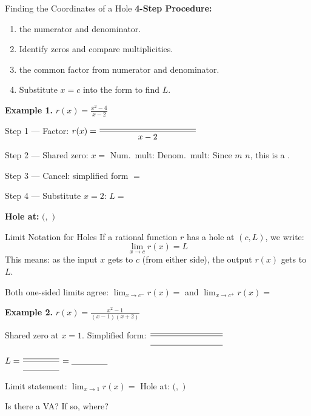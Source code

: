 \documentclass[10pt]{article}
\begin{document}
\vspace{0.08in}

\begin{notesbox}{Finding the Coordinates of a Hole}
\textbf{4-Step Procedure:}
\begin{enumerate}[itemsep=4pt]
  \item \blank{7cm} the numerator and denominator.
  \item Identify \blank{4cm} zeros and compare multiplicities.
  \item \blank{3.5cm} the common factor from numerator and denominator.
  \item Substitute $x = c$ into the \blank{4cm} form to find $L$.
\end{enumerate}

\medskip
\textbf{Example 1.} \quad $\displaystyle r(x) = \frac{x^2 - 4}{x - 2}$

\smallskip
Step 1 --- Factor: $r(x) = \dfrac{\blank{4cm}}{x - 2}$

\smallskip
Step 2 --- Shared zero: $x = $ \blank{1.5cm} \quad Num.\ mult: \blank{1cm} \quad Denom.\ mult: \blank{1cm} \quad Since $m$ \blank{0.6cm} $n$, this is a \blank{2cm}.

\smallskip
Step 3 --- Cancel: simplified form $= $ \blank{3.5cm}

\smallskip
Step 4 --- Substitute $x = 2$: $L = $ \blank{3cm}

\smallskip
\textbf{Hole at:} $\Big($\blank{1cm}$,$ \blank{1cm}$\Big)$
\end{notesbox}

\vspace{0.08in}

\begin{notesbox}{Limit Notation for Holes}
If a rational function $r$ has a hole at $(c, L)$, we write:
\[
  \lim_{x \to c} r(x) = L
\]
This means: as the input $x$ gets \blank{4cm} to $c$ (from either side), the output $r(x)$
gets \blank{4cm} to $L$.

\medskip
Both one-sided limits agree: \quad
$\displaystyle\lim_{x \to c^-} r(x) = $ \blank{1.5cm} \quad and \quad
$\displaystyle\lim_{x \to c^+} r(x) = $ \blank{1.5cm}

\medskip
\textbf{Example 2.} \quad $\displaystyle r(x) = \frac{x^2 - 1}{(x-1)(x+2)}$

Shared zero at $x = 1$. Simplified form: $\dfrac{\blank{3cm}}{\blank{3cm}}$

$L = \dfrac{\blank{1.5cm}}{\blank{1.5cm}} = \blank{1.5cm}$

Limit statement: $\displaystyle \lim_{x \to 1} r(x) = $ \blank{1.5cm} \quad
Hole at: $\Big($\blank{1cm}$,$ \blank{2cm}$\Big)$

\smallskip
Is there a VA? \blank{1cm} \quad If so, where? \blank{3cm}
\end{notesbox}
\end{document}

